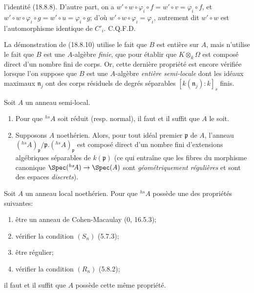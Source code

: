 
l'identité (18.8.8). D'autre part, on a $w'\circ w\circ\varphi_i\circ f=w'\circ v=\varphi_i\circ f$, et $w'\circ w\circ\varphi_i\circ g=w'\circ u=\varphi_i\circ g$; d'où $w'\circ w\circ\varphi_i=\varphi_i$, autrement dit $w'\circ w$ est l'automorphisme identique de $C'_i$. C.Q.F.D.

\begin{remark}[18.8.11]
\label{IV.18.8.11}
La démonstration de (18.8.10) utilise le fait que $B$ est entière sur $A$, mais n'utilise le fait que $B$ est une $A$-algèbre \emph{finie}, que pour établir que $K\otimes_k\Omega$ est composé direct d'un nombre fini de corps. Or, cette dernière propriété est encore vérifiée lorsque l'on suppose que $B$ est une $A$-algèbre \emph{entière semi-locale} dont les idéaux maximaux $\mathfrak n_j$ ont des corps résiduels de degrés séparables $[k(\mathfrak n_j):k]_s$ finis.
\end{remark}

\begin{proposition}[18.8.12]
\label{IV.18.8.12}
Soit $A$ un anneau semi-local.
\begin{enumerate}
  \item[(i)] Pour que ${}^{hs}\!A$ soit réduit (resp. normal), il faut et il suffit que $A$ le soit.
  \item[(ii)] Supposons $A$ noethérien. Alors, pour tout idéal premier $\mathfrak p$ de $A$, l'anneau $({}^{hs}\!A)_{\mathfrak p}/\mathfrak p.({}^{hs}\!A)_{\mathfrak p}$ est composé direct d'un nombre fini d'extensions algébriques séparables de $k(\mathfrak p)$ (ce qui entraîne que les fibres du morphisme canonique $\Spec({}^{hs}\!A)\to\Spec(A)$ sont \emph{géométriquement régulières} et sont des espaces \emph{discrets}).
\end{enumerate}
\end{proposition}

\begin{corollary}[18.8.13]
\label{IV.18.8.13}
Soit $A$ un anneau local noethérien. Pour que ${}^{hs}\!A$ possède une des propriétés suivantes:
\begin{enumerate}
  \item[$a)$] être un anneau de Cohen-Macaulay (0, 16.5.3);
  \item[$b)$] vérifier la condition $(S_n)$ (5.7.3);
  \item[$c)$] être régulier;
  \item[$d)$] vérifier la condition $(R_n)$ (5.8.2);
\end{enumerate}
il faut et il suffit que $A$ possède cette même propriété.
\end{corollary}

